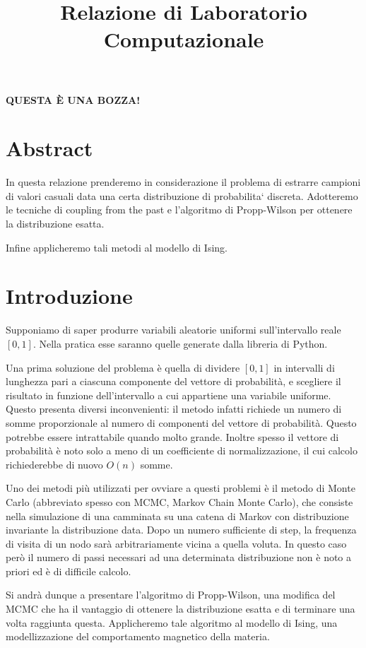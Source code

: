 \documentclass[]{marticle}
\title{\textbf{\Huge Relazione di Laboratorio Computazionale}}
\date{}
\begin{document}
\maketitle

\textbf{QUESTA \`E UNA BOZZA!}

\section*{Abstract}
In questa relazione prenderemo in considerazione il problema di estrarre
campioni di valori casuali data una certa distribuzione di probabilita` discreta.
Adotteremo le tecniche di coupling from the past e l'algoritmo di Propp-Wilson
per ottenere la distribuzione esatta.

Infine applicheremo tali metodi al modello di Ising.

\section{Introduzione}
Supponiamo di saper produrre variabili aleatorie uniformi sull'intervallo reale
$[0,1]$. Nella pratica esse saranno quelle generate dalla libreria 
di Python.

Una prima soluzione del problema \`e quella di dividere $[0,1]$ in intervalli di
lunghezza pari a ciascuna componente del vettore di probabilit\`a, e scegliere
il risultato in funzione dell'intervallo a cui appartiene una variabile
uniforme. Questo presenta diversi inconvenienti: il metodo infatti richiede un
numero di somme proporzionale al numero di componenti del vettore di
probabilit\`a. Questo potrebbe essere intrattabile quando molto grande. Inoltre
spesso il vettore di probabilit\`a \`e noto solo a meno di un coefficiente di
normalizzazione, il cui calcolo richiederebbe di nuovo $O(n)$ somme. 

Uno dei metodi pi\`u utilizzati per ovviare a questi problemi \`e il metodo di
Monte Carlo (abbreviato spesso con MCMC, Markov Chain Monte Carlo), che consiste
nella simulazione di una camminata su una catena di Markov con distribuzione
invariante la distribuzione data. Dopo un numero sufficiente di step, la
frequenza di visita di un nodo sar\`a arbitrariamente vicina a quella voluta. In
questo caso per\`o il numero di passi necessari ad una determinata distribuzione
non \`e noto a priori ed \`e di difficile calcolo.

Si andr\`a dunque a presentare l'algoritmo di Propp-Wilson, una modifica del
MCMC che ha il vantaggio di ottenere la distribuzione esatta e di terminare una
volta raggiunta questa. Applicheremo tale algoritmo al modello di Ising, una
modellizzazione del comportamento magnetico della materia.
\end{document}
